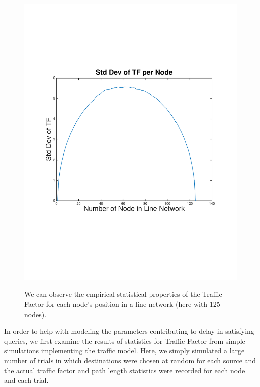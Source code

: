 \begin{figure}
\begin{centering}
{    		\includegraphics[scale=0.4, clip=true, trim=15mm 65mm 20mm 65mm]{figures/std_dev_TF_each_node_line_net_125.pdf}
		\label{fig:std_dev_TF_each_node_line_net}
		}
	\caption{We can observe the empirical statistical properties of the Traffic Factor for each node's position in a line network (here with 125 nodes).}
	\label{fig:TF_empirical_stats_each_node_line_net}
\end{centering}
\end{figure}

In order to help with modeling the parameters contributing to delay in satisfying queries, we first examine the results of statistics for Traffic Factor from simple simulations implementing the traffic model.  Here, we simply simulated a large number of trials in which destinations were chosen at random for each source and the actual traffic factor and path length statistics were recorded for each node and each trial.  

